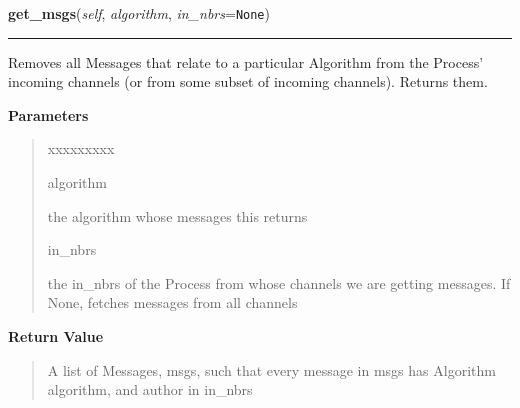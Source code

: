 \hspace{.8\funcindent}\begin{boxedminipage}{\funcwidth}

    \raggedright \textbf{get\_msgs}(\textit{self}, \textit{algorithm}, \textit{in\_nbrs}={\tt None})

    \vspace{-1.5ex}

    \rule{\textwidth}{0.5\fboxrule}
\setlength{\parskip}{2ex}
    Removes all Messages that relate to a particular Algorithm from the 
    Process' incoming channels (or from some subset of incoming channels). 
    Returns them.

\setlength{\parskip}{1ex}
      \textbf{Parameters}
      \vspace{-1ex}

      \begin{quote}
        \begin{Ventry}{xxxxxxxxx}

          \item[algorithm]

          the algorithm whose messages this returns

          \item[in\_nbrs]

          the in\_nbrs of the Process from whose channels we are getting 
          messages. If None, fetches messages from all channels

        \end{Ventry}

      \end{quote}

      \textbf{Return Value}
    \vspace{-1ex}

      \begin{quote}
      A list of Messages, msgs, such that every message in msgs has 
      Algorithm algorithm, and author in in\_nbrs

      \end{quote}

    \end{boxedminipage}

    \label{datk:core:distalgs:Process:add}

    \vspace{0.5ex}

